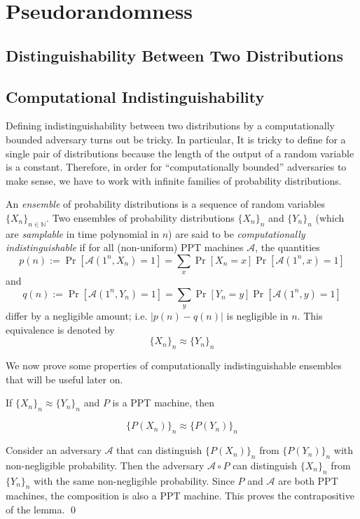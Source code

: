 \newcommand{\ma}{\mathcal{A}}
\chapter{Pseudorandomness}

\section{Distinguishability Between Two Distributions}
\section{Computational Indistinguishability}

Defining indistinguishability between two distributions by a computationally bounded adversary turns out be tricky. In particular, It is tricky to define for a single pair of distributions because the length of the output of a random variable is a constant. Therefore, in order for ``computationally bounded'' adversaries to make sense, we have to work with infinite families of probability distributions.

\begin{definition}
An \emph{ensemble} of probability distributions is a sequence of random variables $\{X_n\}_{n\in \mathbb{N}}$. Two ensembles of probability distributions $\{X_n\}_n$ and $\{Y_n\}_n$ (which are \emph{samplable} in time polynomial in $n$) are said to be \emph{computationally indistinguishable} if for all (non-uniform) PPT machines $\ma$, the quantities
$$p(n) := \Pr[\ma(1^n, X_n) = 1] = \sum_x \Pr[X_n = x]\Pr[\ma(1^n,x) = 1]$$
and
$$q(n) := \Pr[\ma(1^n,Y_n) = 1] = \sum_y \Pr[Y_n = y]\Pr[\ma(1^n,y) = 1]$$
differ by a negligible amount; i.e. $|p(n) - q(n)|$ is negligible in $n$.    
This equivalence is denoted by
$$\{X_n\}_n\approx \{Y_n\}_n$$
\end{definition}
We now prove some properties of computationally indistinguishable ensembles that will be useful later on.

\begin{lemma}
If $\{X_n\}_n\approx\{Y_n\}_n$ and $P$ is a PPT machine, then

$$\{P(X_n)\}_n\approx \{P(Y_n)\}_n$$
\end{lemma}

\proof
Consider an adversary $\ma$ that can distinguish $\{P(X_n)\}_n$ from $\{P(Y_n)\}_n$ with non-negligible probability. Then the adversary $\ma\circ P$ can distinguish $\{X_n\}_n$ from $\{Y_n\}_n$ with the same non-negligible probability. Since $P$ and $\ma$ are both PPT machines, the composition is also a PPT machine. This proves the contrapositive of the lemma.
\qed



